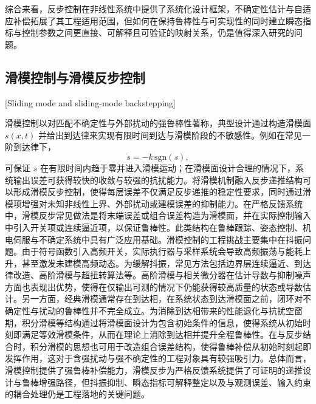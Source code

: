 综合来看，反步控制在非线性系统中提供了系统化设计框架，不确定性估计与自适应补偿拓展了其工程适用范围，但如何在保持鲁棒性与可实现性的同时建立瞬态指标与控制参数之间更直接、可解释且可验证的映射关系，仍是值得深入研究的问题\cite{ref1,ref2,ref3,ref5,ref76,ref77}。

\subsection{滑模控制与滑模反步控制}[Sliding mode and sliding-mode backstepping]

滑模控制以对匹配不确定性与外部扰动的强鲁棒性著称，典型设计通过构造滑模面 $s(x,t)$ 并给出到达律来实现有限时间到达与滑模阶段的不敏感性\cite{ref44,ref45,ref46}。例如在常见一阶到达律下，
\begin{equation}
\dot s = -k\,\mathrm{sgn}(s),
\end{equation}
可保证 $s$ 在有限时间内趋于零并进入滑模运动；在滑模面设计合理的情况下，系统输出误差可获得较快的收敛与较强的抗扰能力\cite{ref44,ref45}。将滑模机制融入反步递推结构可以形成滑模反步控制，使得每层误差不仅满足反步递推的稳定性要求，同时通过滑模项增强对未知非线性上界、外部扰动或建模误差的抑制能力\cite{ref8,ref9,ref10,ref11,ref12,ref18,ref80,ref81}。在严格反馈系统中，滑模反步常见做法是将末端误差或组合误差构造为滑模面，并在实际控制输入中引入开关项或连续逼近项，以保证鲁棒性\cite{ref8,ref10,ref12,ref80,ref81}。此类结构在鲁棒跟踪、姿态控制、机电伺服与不确定系统中具有广泛应用基础\cite{ref8,ref9,ref11,ref80,ref81}。滑模控制的工程挑战主要集中在抖振问题。由于符号函数引入高频开关，实际执行器与采样系统会导致高频振荡与能耗上升，甚至激发未建模高频动态\cite{ref48,ref49}。为缓解抖振，常见方法包括边界层连续逼近、到达律改造、高阶滑模与超扭转算法等\cite{ref46,ref48,ref49}。高阶滑模与相关微分器在估计导数与抑制噪声方面也表现出优势，使得在仅输出可测的情况下仍能获得较高质量的状态或导数估计\cite{ref46,ref29,ref30,ref31}。另一方面，经典滑模通常存在到达相，在系统状态到达滑模面之前，闭环对不确定性与扰动的鲁棒性并不完全成立。为消除到达相带来的性能退化与抗扰空窗期，积分滑模等结构通过将滑模面设计为包含初始条件的信息，使得系统从初始时刻即满足等效滑模条件，从而在理论上消除到达相并提升全程鲁棒性\cite{ref44,ref45,ref50}。在与反步结合时，积分滑模的思想也可用于改造组合误差结构，使得鲁棒补偿从初始时刻起即发挥作用，这对于含强扰动与强不确定性的工程对象具有较强吸引力\cite{ref50,ref12,ref18,ref81}。总体而言，滑模控制提供了强鲁棒补偿能力，滑模反步为严格反馈系统提供了可证明的递推设计与鲁棒增强路径，但抖振抑制、瞬态指标可解释整定以及与观测误差、输入约束的耦合处理仍是工程落地的关键问题\cite{ref8,ref10,ref12,ref46,ref48,ref49,ref80,ref81}。

